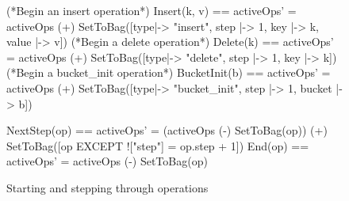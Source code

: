 \documentclass{uit-thesis}
\begin{document}
\begin{figure}
    \begin{tla}
        (*Begin an insert operation*)
        Insert(k, v) == activeOps' = activeOps (+) SetToBag({[type|-> "insert", step |-> 1, key |-> k, value |-> v]})
        (*Begin a delete operation*)
        Delete(k) == activeOps' = activeOps (+) SetToBag({[type|-> "delete", step |-> 1, key |-> k]})
        (*Begin a bucket_init operation*)
        BucketInit(b) == activeOps' = activeOps (+) SetToBag({[type|-> "bucket_init", step |-> 1, bucket |-> b]})
        
        NextStep(op) == activeOps' = (activeOps (-) SetToBag({op})) (+) SetToBag({[op EXCEPT !["step"] = op.step + 1]})
        End(op) == activeOps' = activeOps (-) SetToBag({op})
    \end{tla}
    \begin{tlatex}
%
%
\@xx{}%
%
%
\@xx{}%
%
%
\@xx{}%
\@pvspace{8.0pt}%
\end{tlatex}
\caption{Starting and stepping through operations}
\label{fig:op-progress}
\end{figure}
\end{document}
